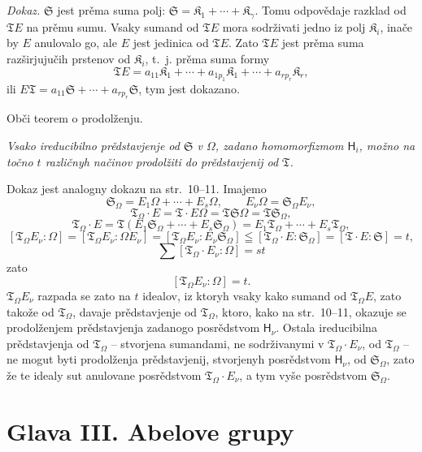 \documentclass[11pt]{article}
\begin{document}
\emph{Dokaz.} \(\mathfrak S\) jest prěma suma polj: \(\mathfrak S=\mathfrak K_1+\cdots+\mathfrak K_\gamma\). Tomu odpovědaje razklad od \(\mathfrak T E\) na prěmu sumu. Vsaky sumand od \(\mathfrak T E\) mora sodrživati jedno iz polj \(\mathfrak K_i\), inače by \(E\) anulovalo go, ale \(E\) jest jedinica od \(\mathfrak T E\). Zato \(\mathfrak T E\) jest prěma suma razširjujučih prstenov od \(\mathfrak K_i\), t.~j. prěma suma formy
\[
\mathfrak T E=a_{11}\mathfrak K_1+\cdots+a_{1p_1}\mathfrak K_1+\cdots+a_{rp_r}\mathfrak K_r,
\]
ili \(E\mathfrak T=a_{11}\mathfrak S+\cdots+a_{rp_r}\mathfrak S\), tym jest dokazano.

\begin{center}
Obči teorem o prodolženju.
\end{center}

\emph{Vsako ireducibilno prědstavjenje od \(\mathfrak S\) v \(\Omega\), zadano homomorfizmom \(\mathsf{H}_i\), možno na točno \(t\) različnyh načinov prodolžiti do prědstavjenij od \(\mathfrak T\).}

Dokaz jest analogny dokazu na str.~10--11. Imajemo
\[
\mathfrak S_\Omega=E_1\Omega+\cdots+E_s\Omega,\qquad
E_\nu\Omega=\mathfrak S_\Omega E_\nu,
\]
\[
\mathfrak T_\Omega\cdot E=\mathfrak T\cdot E\Omega
=\mathfrak T\mathfrak S\Omega=\mathfrak T\mathfrak S_\Omega,
\]
\[
\mathfrak T_\Omega\cdot E
=\mathfrak T(E_1\mathfrak S_\Omega+\cdots+E_s\mathfrak S_\Omega)
=E_1\mathfrak T_\Omega+\cdots+E_s\mathfrak T_\Omega,
\]
\[
[\mathfrak T_\Omega E_\nu:\Omega]
=[\mathfrak T_\Omega E_\nu:\Omega E_\nu]
=[\mathfrak T_\Omega E_\nu:E_\nu\mathfrak S_\Omega]
\leqq[\mathfrak T_\Omega\cdot E:\mathfrak S_\Omega]
=[\mathfrak T\cdot E:\mathfrak S]=t,
\]
\[
\sum[\mathfrak T_\Omega\cdot E_\nu:\Omega]=st
\]
zato
\[
[\mathfrak T_\Omega E_\nu:\Omega]=t.
\]
\(\mathfrak T_\Omega E_\nu\) razpada se zato na \(t\) idealov, iz ktoryh vsaky kako sumand od \(\mathfrak T_\Omega E\), zato takože od \(\mathfrak T_\Omega\), davaje prědstavjenje od \(\mathfrak T_\Omega\), ktoro, kako na str.~10--11, okazuje se prodolženjem prědstavjenja zadanogo posrědstvom \(\mathsf{H}_\nu\). Ostala ireducibilna prědstavjenja od \(\mathfrak T_\Omega\) -- stvorjena sumandami, ne sodrživanymi v \(\mathfrak T_\Omega\cdot E_\nu\), od \(\mathfrak T_\Omega\) -- ne mogut byti prodolženja prědstavjenij, stvorjenyh posrědstvom \(\mathsf{H}_\nu\), od \(\mathfrak S_\Omega\), zato že te idealy sut anulovane posrědstvom \(\mathfrak T_\Omega\cdot E_\nu\), a tym vyše posrědstvom \(\mathfrak S_\Omega\).

\section*{Glava III. Abelove grupy}\label{kapitel-iii.-abelsche-gruppen}
\end{document}

